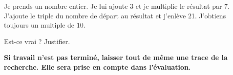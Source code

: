 
\medskip 

\og Je prends un nombre entier. Je lui ajoute 3 et je multiplie le résultat par 7. J'ajoute le triple du nombre de départ au résultat et j'enlève 21. J'obtiens toujours un multiple de 10.\fg

\medskip

Est-ce vrai ? Justifier.
 
\textbf{Si travail n'est pas terminé, laisser tout de même une trace de la recherche. Elle sera prise en compte dans l'évaluation.}
 
\vspace{0,5cm}

